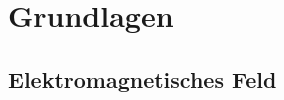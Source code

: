 \chapter{Grundlagen}
\label{chap:Grundlagen}

\section{Elektromagnetisches Feld}
\label{sec:Elektromagnetisches Feld}
